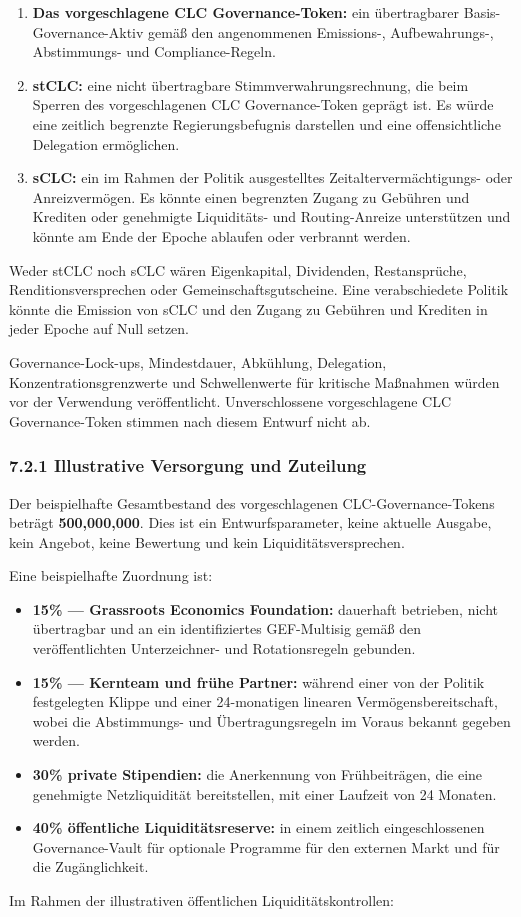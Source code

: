 \documentclass[11pt]{article}
\begin{document}
\begin{enumerate}[leftmargin=*]
\item \textbf{Das vorgeschlagene CLC Governance-Token:} ein übertragbarer Basis-Governance-Aktiv gemäß den angenommenen Emissions-, Aufbewahrungs-, Abstimmungs- und Compliance-Regeln.
\item \textbf{stCLC:} eine nicht übertragbare Stimmverwahrungsrechnung, die beim Sperren des vorgeschlagenen CLC Governance-Token geprägt ist. Es würde eine zeitlich begrenzte Regierungsbefugnis darstellen und eine offensichtliche Delegation ermöglichen.
\item \textbf{sCLC:} ein im Rahmen der Politik ausgestelltes Zeitaltervermächtigungs- oder Anreizvermögen. Es könnte einen begrenzten Zugang zu Gebühren und Krediten oder genehmigte Liquiditäts- und Routing-Anreize unterstützen und könnte am Ende der Epoche ablaufen oder verbrannt werden.
\end{enumerate}
Weder stCLC noch sCLC wären Eigenkapital, Dividenden, Restansprüche, Renditionsversprechen oder Gemeinschaftsgutscheine. Eine verabschiedete Politik könnte die Emission von sCLC und den Zugang zu Gebühren und Krediten in jeder Epoche auf Null setzen.

Governance-Lock-ups, Mindestdauer, Abkühlung, Delegation, Konzentrationsgrenzwerte und Schwellenwerte für kritische Maßnahmen würden vor der Verwendung veröffentlicht. Unverschlossene vorgeschlagene CLC Governance-Token stimmen nach diesem Entwurf nicht ab.

\subsubsection*{7.2.1 Illustrative Versorgung und Zuteilung}

Der beispielhafte Gesamtbestand des vorgeschlagenen CLC-Governance-Tokens beträgt \textbf{500,000,000}. Dies ist ein Entwurfsparameter, keine aktuelle Ausgabe, kein Angebot, keine Bewertung und kein Liquiditätsversprechen.

Eine beispielhafte Zuordnung ist:

\begin{itemize}[leftmargin=*]
\item \textbf{15\% --- Grassroots Economics Foundation:} dauerhaft betrieben, nicht übertragbar und an ein identifiziertes GEF-Multisig gemäß den veröffentlichten Unterzeichner- und Rotationsregeln gebunden.
\item \textbf{15\% --- Kernteam und frühe Partner:} während einer von der Politik festgelegten Klippe und einer 24-monatigen linearen Vermögensbereitschaft, wobei die Abstimmungs- und Übertragungsregeln im Voraus bekannt gegeben werden.
\item \textbf{30\%  private Stipendien:} die Anerkennung von Frühbeiträgen, die eine genehmigte Netzliquidität bereitstellen, mit einer Laufzeit von 24 Monaten.
\item \textbf{40\%  öffentliche Liquiditätsreserve:} in einem zeitlich eingeschlossenen Governance-Vault für optionale Programme für den externen Markt und für die Zugänglichkeit.
\end{itemize}
Im Rahmen der illustrativen öffentlichen Liquiditätskontrollen:
\end{document}
